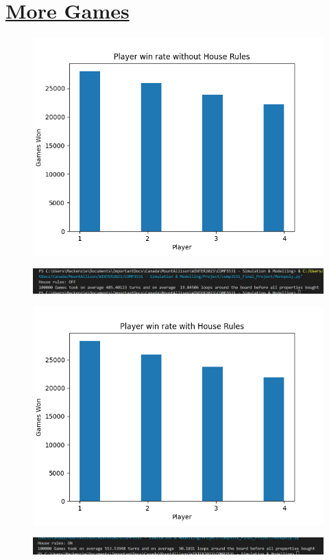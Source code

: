 \documentclass[a4paper,reqno,12pt]{report}
\begin{document}
\section*{\underline{More Games}}
\begin{figure}[h]
\includegraphics[width=15cm]{houseRulesOFF_50turns_+1_100000games.png}
\centering
\end{figure}
\begin{figure}[h]
\includegraphics[width=15cm]{100000games_HouseRulesOFF_averages.png}
\centering
\end{figure}
\begin{figure}[h]
\includegraphics[width=15cm]{houseRulesON_50turns_+1_100000games.png}
\centering
\end{figure}
\begin{figure}[h]
\includegraphics[width=15cm]{100000games_HouseRulesON_averages.png}
\centering
\end{figure}
\clearpage
\end{document}
